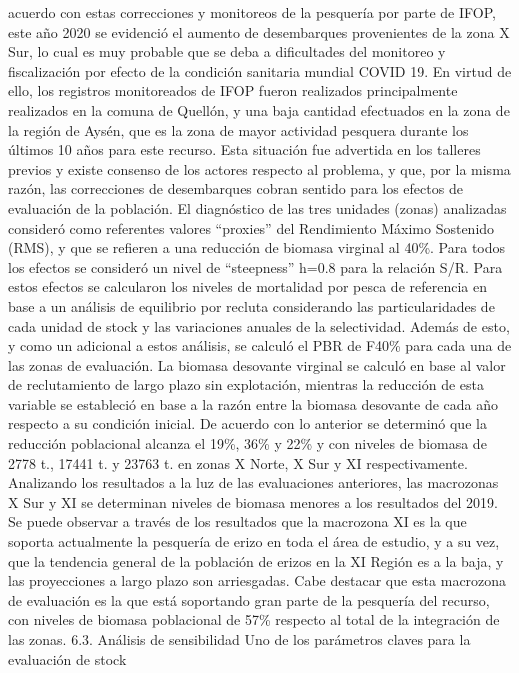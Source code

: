 \documentclass[
]{article}
\begin{document}
acuerdo con estas correcciones y monitoreos de la pesquería por parte de
IFOP, este año 2020 se evidenció el aumento de desembarques provenientes
de la zona X Sur, lo cual es muy probable que se deba a dificultades del
monitoreo y fiscalización por efecto de la condición sanitaria mundial
COVID 19. En virtud de ello, los registros monitoreados de IFOP fueron
realizados principalmente realizados en la comuna de Quellón, y una baja
cantidad efectuados en la zona de la región de Aysén, que es la zona de
mayor actividad pesquera durante los últimos 10 años para este recurso.
Esta situación fue advertida en los talleres previos y existe consenso
de los actores respecto al problema, y que, por la misma razón, las
correcciones de desembarques cobran sentido para los efectos de
evaluación de la población. El diagnóstico de las tres unidades (zonas)
analizadas consideró como referentes valores ``proxies'' del Rendimiento
Máximo Sostenido (RMS), y que se refieren a una reducción de biomasa
virginal al 40\%. Para todos los efectos se consideró un nivel de
``steepness'' h=0.8 para la relación S/R. Para estos efectos se
calcularon los niveles de mortalidad por pesca de referencia en base a
un análisis de equilibrio por recluta considerando las particularidades
de cada unidad de stock y las variaciones anuales de la selectividad.
Además de esto, y como un adicional a estos análisis, se calculó el PBR
de F40\% para cada una de las zonas de evaluación. La biomasa desovante
virginal se calculó en base al valor de reclutamiento de largo plazo sin
explotación, mientras la reducción de esta variable se estableció en
base a la razón entre la biomasa desovante de cada año respecto a su
condición inicial. De acuerdo con lo anterior se determinó que la
reducción poblacional alcanza el 19\%, 36\% y 22\% y con niveles de
biomasa de 2778 t., 17441 t. y 23763 t. en zonas X Norte, X Sur y XI
respectivamente. Analizando los resultados a la luz de las evaluaciones
anteriores, las macrozonas X Sur y XI se determinan niveles de biomasa
menores a los resultados del 2019. Se puede observar a través de los
resultados que la macrozona XI es la que soporta actualmente la
pesquería de erizo en toda el área de estudio, y a su vez, que la
tendencia general de la población de erizos en la XI Región es a la
baja, y las proyecciones a largo plazo son arriesgadas. Cabe destacar
que esta macrozona de evaluación es la que está soportando gran parte de
la pesquería del recurso, con niveles de biomasa poblacional de 57\%
respecto al total de la integración de las zonas. 6.3. Análisis de
sensibilidad Uno de los parámetros claves para la evaluación de stock
\end{document}

